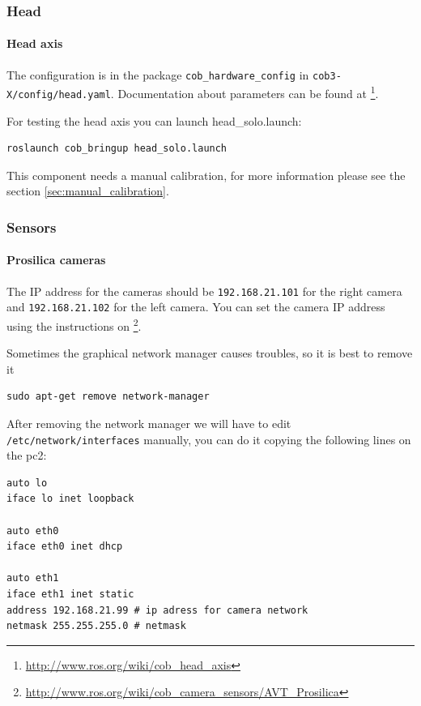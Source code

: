 \subsubsection{Head}

\paragraph{Head axis}
The configuration is in the package \texttt{cob\_hardware\_config} in \texttt{cob3-X/config/head.yaml}. Documentation about parameters can be found at \footnote{\url{http://www.ros.org/wiki/cob_head_axis}}.

For testing the head axis you can launch head\_solo.launch:
\begin{lstlisting}
roslaunch cob_bringup head_solo.launch
\end{lstlisting}

This component needs a manual calibration, for more information please see the section \ref{sec:manual_calibration}.

\subsubsection{Sensors} 

\paragraph{Prosilica cameras}
The IP address for the cameras should be \texttt{192.168.21.101} for the right camera and \texttt{192.168.21.102} for the left camera. You can set the camera IP address using the instructions on \footnote{\url{http://www.ros.org/wiki/cob_camera_sensors/AVT_Prosilica}}.

Sometimes the graphical network manager causes troubles, so it is best to remove it
\begin{lstlisting}
sudo apt-get remove network-manager
\end{lstlisting}

After removing the network manager we will have to edit \texttt{/etc/network/interfaces} manually,  you can do it copying the following lines on the pc2:

\begin{lstlisting} 
auto lo
iface lo inet loopback

auto eth0
iface eth0 inet dhcp

auto eth1
iface eth1 inet static
address 192.168.21.99 # ip adress for camera network
netmask 255.255.255.0 # netmask
\end{lstlisting}

